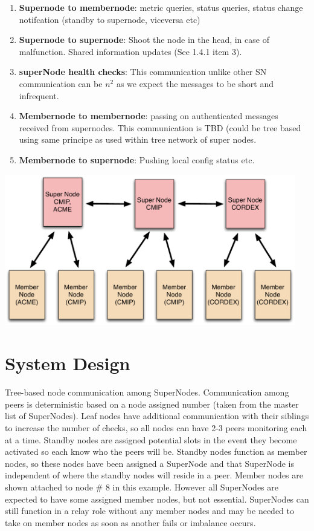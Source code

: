 \documentclass[oneside,12pt]{memoir}
\begin{document}
\begin{enumerate}
\item \textbf{Supernode to membernode}: metric queries, status queries, status change notifcation (standby to supernode, viceversa etc)
\item \textbf{Supernode to supernode}: Shoot the node in the head, in case of malfunction.  Shared information updates (See 1.4.1 item 3).  
\item \textbf{superNode health checks}:  This communication unlike other SN communication can be $n^2$ as we expect the messages to be short and infrequent.  
\item \textbf{Membernode to membernode}: passing on authenticated messages received from supernodes.  This communication is TBD (could be tree based using same principe as used within tree network of super nodes. %
\item \textbf{Membernode to supernode}: Pushing local config status etc.
\end{enumerate}

\begin{center}
\includegraphics[width=5in]{presentation/ESG-node-org.pdf}
\end{center}

\section{System Design}

Tree-based node communication among SuperNodes.  Communication among peers is deterministic based on a node assigned number (taken from the master list of SuperNodes).   Leaf nodes have additional communication with their siblings to increase the number of checks, so all nodes can have 2-3 peers monitoring each at a time.  Standby nodes are assigned potential slots in the event they become activated so each know who the peers will be.  Standby nodes function as member nodes, so these nodes have been assigned a SuperNode and that SuperNode is independent of where the standby nodes will reside in a peer.  Member nodes are shown attached to node \# 8 in this example.  However all SuperNodes are expected to have some assigned member nodes, but not essential.  SuperNodes can still function in a relay role without any member nodes and may be needed to take on member nodes as soon as another fails or imbalance occurs. 
\end{document}
